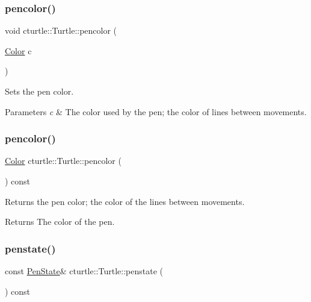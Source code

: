 \subsubsection{\texorpdfstring{pencolor()}{pencolor()}\hspace{0.1cm}{\footnotesize\ttfamily [1/2]}}
{\footnotesize\ttfamily void cturtle\+::\+Turtle\+::pencolor (\begin{DoxyParamCaption}\item[{\hyperlink{classcturtle_1_1Color}{Color}}]{c }\end{DoxyParamCaption})\hspace{0.3cm}{\ttfamily [inline]}}



Sets the pen color. 


\begin{DoxyParams}{Parameters}
{\em c} & The color used by the pen; the color of lines between movements. \\
\hline
\end{DoxyParams}
\mbox{\label{classcturtle_1_1Turtle_ab14dd65bd0e882b815755656072a9cdd}} 
\subsubsection{\texorpdfstring{pencolor()}{pencolor()}\hspace{0.1cm}{\footnotesize\ttfamily [2/2]}}
{\footnotesize\ttfamily \hyperlink{classcturtle_1_1Color}{Color} cturtle\+::\+Turtle\+::pencolor (\begin{DoxyParamCaption}{ }\end{DoxyParamCaption}) const\hspace{0.3cm}{\ttfamily [inline]}}



Returns the pen color; the color of the lines between movements. 

\begin{DoxyReturn}{Returns}
The color of the pen. 
\end{DoxyReturn}
\mbox{\label{classcturtle_1_1Turtle_a2f6a16a0f4d700470bf69e0a15f3d2f4}} 
\subsubsection{\texorpdfstring{penstate()}{penstate()}}
{\footnotesize\ttfamily const \hyperlink{structcturtle_1_1PenState}{Pen\+State}\& cturtle\+::\+Turtle\+::penstate (\begin{DoxyParamCaption}{ }\end{DoxyParamCaption}) const\hspace{0.3cm}{\ttfamily [inline]}}

